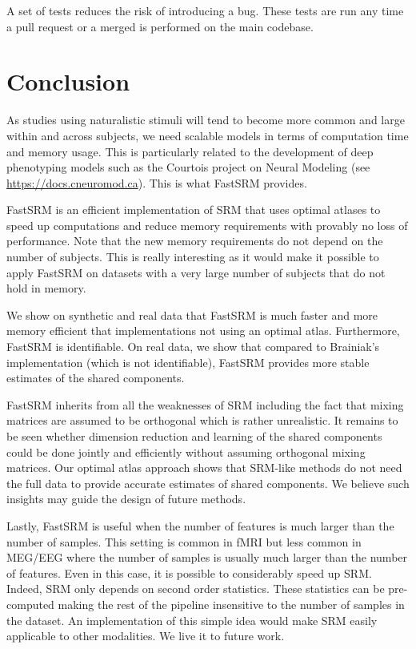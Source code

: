 \documentclass{article}
\newcommand{\bt}[1]{\todo[color=orange, inline=True]{BT: #1}}
\begin{document}
A set of tests reduces the risk of introducing a bug. These tests are run any
time a pull request or a merged is performed on the main codebase.

\section{Conclusion}
As studies using naturalistic stimuli will tend to become more common and large
within and across subjects, we need scalable models in terms of computation time
and memory usage.
%
This is particularly related to the development of deep phenotyping
models such as the Courtois project on Neural Modeling (see \url{https://docs.cneuromod.ca}).
%
This is what FastSRM provides.

%
FastSRM is an efficient implementation of SRM
that uses optimal atlases to speed up computations and reduce memory requirements
with provably no loss of performance. 
Note that the new memory requirements do not depend on the number of subjects.
This is really interesting as it would make it possible to apply FastSRM on
datasets with a very large number of subjects that do not hold in memory.


We show on synthetic and real data that FastSRM is much faster and more memory
efficient that implementations not using an optimal atlas.
Furthermore, FastSRM is identifiable. On real data, we show that compared to
Brainiak's implementation (which is not identifiable), FastSRM provides more
stable estimates of the shared components.


%
FastSRM inherits from all the weaknesses of SRM including the fact that
mixing matrices are assumed to be orthogonal which is rather unrealistic. It
remains to be seen whether dimension reduction and learning of the shared
components could be done jointly and efficiently without assuming orthogonal
mixing matrices.
%
Our optimal atlas approach shows that SRM-like methods do not need the
full data to provide accurate estimates of shared components. We believe such
insights may guide the design of future methods.
%

Lastly, FastSRM is useful when the number of features is much larger than the
number of samples. This setting is common in fMRI but less common in MEG/EEG where
the number of samples is usually much larger than the number of features. Even
in this case, it is possible to considerably speed up SRM. Indeed, SRM only
depends on second order statistics.
These statistics can be pre-computed making the rest of the
pipeline insensitive to the number of samples in the dataset. An implementation
of this simple idea would make SRM easily applicable to other modalities.
We live it to future work.



\end{document}
